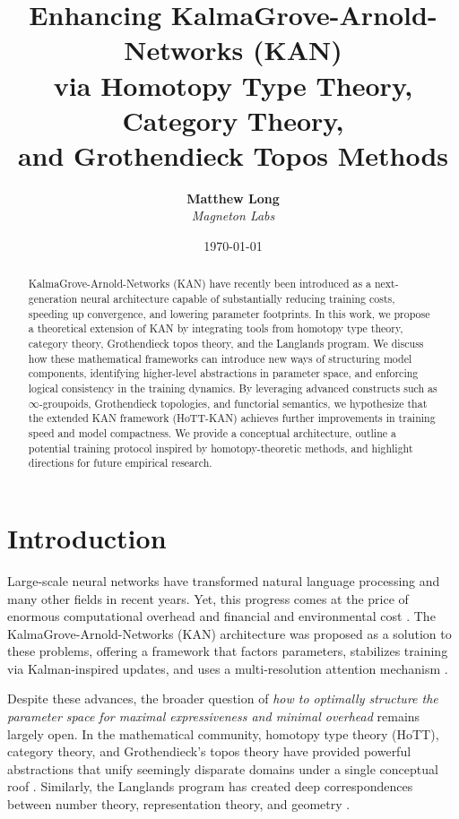 \documentclass{article}
\title{%
Enhancing KalmaGrove-Arnold-Networks (KAN) \\
via Homotopy Type Theory, Category Theory, \\
and Grothendieck Topos Methods}
\author{
  \textbf{Matthew Long}\\
  \textit{Magneton Labs}
}
\date{\today}
\begin{document}
\maketitle

\begin{abstract}
KalmaGrove-Arnold-Networks (KAN) have recently been introduced as a next-generation neural architecture capable of substantially reducing training costs, speeding up convergence, and lowering parameter footprints. In this work, we propose a theoretical extension of KAN by integrating tools from homotopy type theory, category theory, Grothendieck topos theory, and the Langlands program. We discuss how these mathematical frameworks can introduce new ways of structuring model components, identifying higher-level abstractions in parameter space, and enforcing logical consistency in the training dynamics. By leveraging advanced constructs such as $\infty$-groupoids, Grothendieck topologies, and functorial semantics, we hypothesize that the extended KAN framework (HoTT-KAN) achieves further improvements in training speed and model compactness. We provide a conceptual architecture, outline a potential training protocol inspired by homotopy-theoretic methods, and highlight directions for future empirical research.
\end{abstract}

\section{Introduction}
\label{sec:intro}

Large-scale neural networks have transformed natural language processing and many other fields in recent years. Yet, this progress comes at the price of enormous computational overhead and financial and environmental cost \citep{strubell2019energy}. The KalmaGrove-Arnold-Networks (KAN) architecture was proposed as a solution to these problems, offering a framework that factors parameters, stabilizes training via Kalman-inspired updates, and uses a multi-resolution attention mechanism \citep{KAN2024}.

Despite these advances, the broader question of \emph{how to optimally structure the parameter space for maximal expressiveness and minimal overhead} remains largely open. In the mathematical community, homotopy type theory (HoTT), category theory, and Grothendieck’s topos theory have provided powerful abstractions that unify seemingly disparate domains under a single conceptual roof \citep{hottbook, maclane1971categories, grothendieck1972}. Similarly, the Langlands program has created deep correspondences between number theory, representation theory, and geometry \citep{langlands1970problems}.
\end{document}
